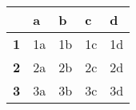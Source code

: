 \begin{table}[htbp]
    \centering
\begin{tabular}{lllll}
\hline
           & \textbf{a} & \textbf{b} & \textbf{c} & \textbf{d} \\ \hline
\textbf{1} & 1a         & 1b         & 1c         & 1d         \\
\textbf{2} & 2a         & 2b         & 2c         & 2d         \\
\textbf{3} & 3a         & 3b         & 3c         & 3d         \\ \hline
\end{tabular}
    \label{tab:tabela2}
\end{table}
